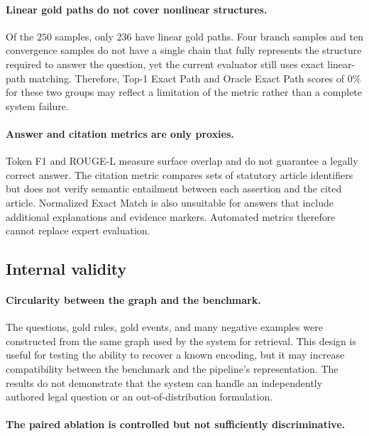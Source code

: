 \paragraph{Linear gold paths do not cover nonlinear structures.}

Of the $250$ samples, only $236$ have linear gold paths. Four branch samples
and ten convergence samples do not have a single chain that fully represents
the structure required to answer the question, yet the current evaluator
still uses exact linear-path matching. Therefore, Top-1 Exact Path and Oracle
Exact Path scores of $0\%$ for these two groups may reflect a limitation of
the metric rather than a complete system failure.

\paragraph{Answer and citation metrics are only proxies.}

Token F1 and ROUGE-L measure surface overlap and do not guarantee a legally
correct answer. The citation metric compares sets of statutory article
identifiers but does not verify semantic entailment between each assertion
and the cited article. Normalized Exact Match is also unsuitable for answers
that include additional explanations and evidence markers. Automated metrics
therefore cannot replace expert evaluation.

\subsection{Internal validity}

\paragraph{Circularity between the graph and the benchmark.}

The questions, gold rules, gold events, and many negative examples were
constructed from the same graph used by the system for retrieval. This design
is useful for testing the ability to recover a known encoding, but it may
increase compatibility between the benchmark and the pipeline's
representation. The results do not demonstrate that the system can handle an
independently authored legal question or an out-of-distribution formulation.

\paragraph{The paired ablation is controlled but not sufficiently
discriminative.}

